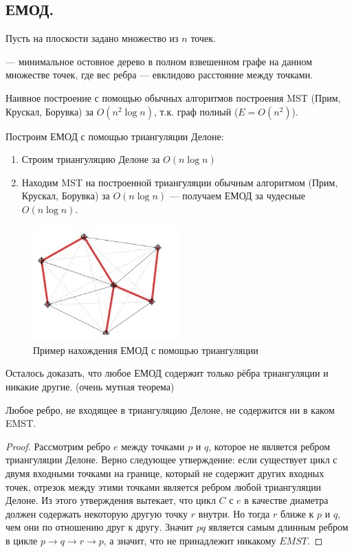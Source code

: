 \subsection{ЕМОД.}
Пусть на плоскости задано множество из $n$ точек.
\begin{definition}
   --- минимальное остовное дерево в полном
  взвешенном графе на данном множестве точек, где вес ребра --- евклидово расстояние между точками.
\end{definition}

Наивное построение с помощью обычных алгоритмов построения MST (Прим, Крускал, Борувка) за $O(n^2 \log n)$,
т.к. граф полный ($E = O(n^2)$).

Построим ЕМОД с помощью триангуляции Делоне:
\begin{enumerate}
  \item Строим триангуляцию Делоне за $O(n \log n)$
  \item Находим MST на построенной триангуляции обычным алгоритмом (Прим, Крускал, Борувка) за 
    $O(n \log n)$ --- получаем ЕМОД за чудесные $O(n \log n)$.
\end{enumerate}

\begin{figure}[H]    
  \centering    
  \includegraphics[width=0.5\textwidth]{figures/deloneMST.png}    
  \caption*{Пример нахождения ЕМОД с помощью триангуляции}        
\end{figure} 

Осталось доказать, что любое ЕМОД содержит только рёбра триангуляции и никакие другие.
(очень мутная теорема)
\begin{theorem}
  Любое ребро, не входящее в триангуляцию Делоне, не содержится ни в каком EMST.  
\end{theorem}
\begin{proof}
  Рассмотрим ребро $e$ между точками $p$ и $q$, которое не является ребром триангуляции Делоне.
  Верно следующее утверждение: если существует цикл с двумя входными точками на границе, 
  который не содержит других входных точек, отрезок между этими точками является ребром любой триангуляции
  Делоне. Из этого утверждения вытекает, что цикл $C$ с $e$ в качестве диаметра должен содержать
  некоторую другую точку $r$ внутри. Но тогда $r$ ближе к $p$ и $q$, чем они по отношению друг к другу.
  Значит $pq$ является самым длинным ребром в цикле $p \to  q \to r \to p$, а значит, что не принадлежит
  никакому $EMST$.
\end{proof}




